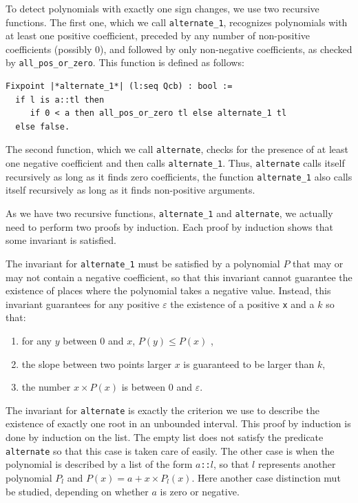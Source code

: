 \documentclass{mscs}
\begin{document}
To detect polynomials with exactly one sign changes, we use two recursive
functions.  The first one, which we call {\tt alternate\_1}, recognizes
polynomials with at least one positive coefficient, preceded by any number
of non-positive coefficients (possibly 0), and followed by only non-negative
coefficients, as checked by {\tt all\_pos\_or\_zero}.  This function is
defined as follows:
\begin{lstlisting}
Fixpoint |*alternate_1*| (l:seq Qcb) : bool :=
  if l is a::tl then
     if 0 < a then all_pos_or_zero tl else alternate_1 tl
  else false.
\end{lstlisting}
The second function, which we call {\tt alternate}, checks for the
presence of at least one negative coefficient and then calls {\tt alternate\_1}.
Thus, {\tt alternate} calls itself recursively
as long as it finds zero coefficients, the function {\tt alternate\_1}
also calls itself recursively as long as it finds
non-positive arguments.

As we have two recursive functions, {\tt alternate\_1} and {\tt alternate},
we actually need to perform two proofs by induction.  Each proof by induction
shows that some invariant is satisfied.

The invariant for {\tt alternate\_1}
must be satisfied by a polynomial \(P\) that may or may not contain a negative
coefficient, so that this invariant cannot guarantee the existence of
places where the polynomial takes a negative value.  Instead, this invariant
guarantees for any positive \(\varepsilon\) the existence of a positive {\tt x}
and a \(k\) so that:
\begin{enumerate}
\item for any \(y\) between \(0\) and \(x\), \(P(y) \leq P (x)\) ,
\item the slope between two points larger \(x\) is guaranteed to be larger
than \(k\),
\item the number \(x \times P(x)\) is between \(0\) and \(\varepsilon\).
\end{enumerate}

The invariant for {\tt alternate} is exactly the criterion we use
to describe the existence of exactly one root in an unbounded interval.
This proof by induction is done by induction on the list.  The empty list
does not satisfy the predicate {\tt alternate} so that this case is
taken care of easily.  The other case is when the polynomial is described
by a list of the form {\tt \(a\)::\(l\)}, so that \(l\) represents another polynomial
\(P_l\) and \(P(x) = a + x \times P_l(x)\).  Here another case distinction mut be
studied, depending on whether \(a\) is zero or negative.
\end{document}
